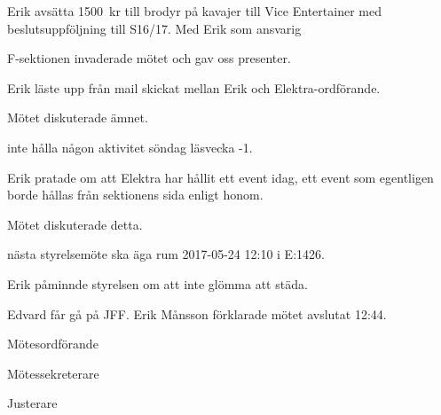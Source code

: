 \documentclass[10pt]{article}
\def\mo{Erik Månsson}
\def\ms{Johan Karlberg}
\def\ji{Albin Nyström Eklund}
\begin{document}
\begin{paragrafer}
Erik \ypa avsätta \SI{1500}{kr} till brodyr på kavajer till Vice Entertainer med beslutsuppföljning till S16/17. Med Erik som ansvarig

F-sektionen invaderade mötet och gav oss presenter.

Erik läste upp från mail skickat mellan Erik och Elektra-ordförande.

Mötet diskuterade ämnet.

\Mba inte hålla någon aktivitet söndag läsvecka -1.

Erik pratade om att Elektra har hållit ett event idag, ett event som egentligen borde hållas från sektionens sida enligt honom.

Mötet diskuterade detta.

{\Mba} nästa styrelsemöte ska äga rum 2017-05-24 12:10 i E:1426.

{\Ibfu}

Erik påminnde styrelsen om att inte glömma att städa.

Edvard får gå på JFF.
{\mo} förklarade mötet avslutat 12:44.

\end{paragrafer}

\newpage
\hidesignfoot
\begin{signatures}{3}
\signature{\mo}{Mötesordförande}
\signature{\ms}{Mötessekreterare}
\signature{\ji}{Justerare}
\end{signatures}
\end{document}
